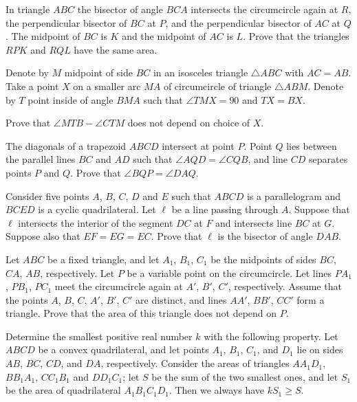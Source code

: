 \item[\textbf{G1.}]
In triangle 
$ ABC$
 the bisector of angle 
$ BCA$
 intersects the circumcircle again at 
$ R$, 
 the perpendicular bisector of 
$ BC$
 at 
$ P$, 
 and the perpendicular bisector of 
$ AC$
 at 
$ Q$.
 The midpoint of 
$ BC$
 is 
$ K$
 and the midpoint of 
$ AC$
 is 
$ L$.
 Prove that the triangles 
$ RPK$
 and 
$ RQL$
 have the same area.

\item[\textbf{G2.}]
Denote by 
$ M$
 midpoint of side 
$ BC$
 in an isosceles triangle 
$ \triangle ABC$
 with 
$ AC = AB$.
 Take a point 
$ X$
 on a smaller arc 
$MA$
 of circumcircle of triangle 
$ \triangle ABM$.
 Denote by 
$ T$
 point inside of angle 
$ BMA$
 such that 
$ \angle TMX = 90$
 and 
$ TX = BX$.


Prove that 
$ \angle MTB - \angle CTM$
 does not depend on choice of 
$ X$.

\item[\textbf{G3.}]
The diagonals of a trapezoid 
$ ABCD$
 intersect at point 
$ P$.
 Point 
$ Q$
 lies between the parallel lines 
$ BC$
 and 
$ AD$
 such that 
$ \angle AQD = \angle CQB$, 
 and line 
$ CD$
 separates points 
$ P$
 and 
$ Q$.
 Prove that 
$ \angle BQP = \angle DAQ$.

\item[\textbf{G4.}]
Consider five points 
$ A$, 
$ B$, 
$ C$, 
$ D$
 and 
$ E$
 such that 
$ ABCD$
 is a parallelogram and 
$ BCED$
 is a cyclic quadrilateral. Let 
$ \ell$
 be a line passing through 
$ A$.
 Suppose that 
$ \ell$
 intersects the interior of the segment 
$ DC$
 at 
$ F$
 and intersects line 
$ BC$
 at 
$ G$.
 Suppose also that 
$ EF = EG = EC$.
 Prove that 
$ \ell$
 is the bisector of angle 
$ DAB$.

\item[\textbf{G5.}]
Let 
$ ABC$
 be a fixed triangle, and let 
$ A_1$, 
$ B_1$, 
$ C_1$ be the midpoints of sides 
$ BC$,
$ CA$, 
$ AB$, 
 respectively. Let 
$ P$
 be a variable point on the circumcircle. Let lines 
$ PA_1$, 
$ PB_1$, 
$ PC_1$
 meet the circumcircle again at 
$ A'$, 
$ B'$, 
$ C'$, 
 respectively. Assume that the points 
$ A$, 
$ B$, 
$ C$, 
$ A'$, 
$ B'$, 
$ C'$
 are distinct, and lines 
$ AA'$,
$ BB'$, 
$ CC'$
 form a triangle. Prove that the area of this triangle does not depend on 
$ P$.

\item[\textbf{G6.}]
Determine the smallest positive real number 
$ k$
 with the following property. Let 
$ ABCD$
 be a convex quadrilateral, and let points 
$ A_1$, 
$ B_1$, 
$ C_1$, 
 and 
$ D_1$
 lie on sides 
$ AB$, 
$ BC$, 
$ CD$, 
 and 
$ DA$, 
 respectively. Consider the areas of triangles 
$ AA_1D_1$, 
$ BB_1A_1$, 
$ CC_1B_1$ and 
$ DD_1C_1$;
 let 
$ S$
 be the sum of the two smallest ones, and let 
$ S_1$
 be the area of quadrilateral 
$ A_1B_1C_1D_1$.
 Then we always have 
$ kS_1\ge S$.


